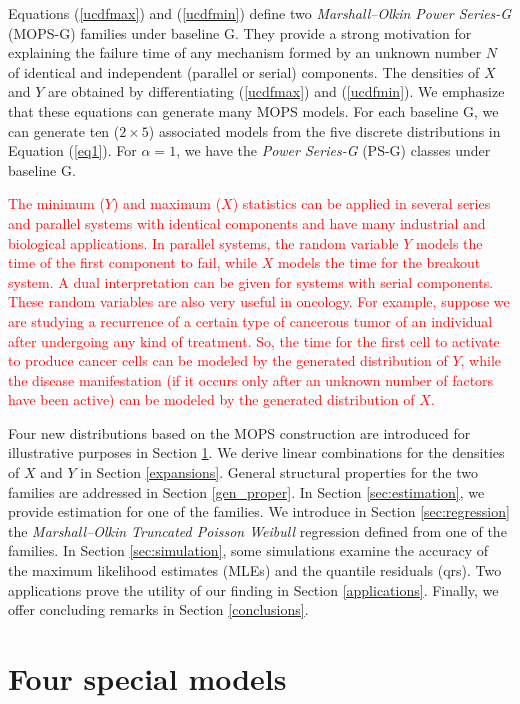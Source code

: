 \documentclass[12pt]{article}
\begin{document}
Equations (\ref{ucdfmax}) and (\ref{ucdfmin}) define two {\it Marshall--Olkin Power Series-G} (MOPS-G) families under baseline G. They provide a strong
motivation for explaining the failure time of any mechanism formed by an unknown number $N$ of identical and independent (parallel or serial) components.
The densities of $X$ and $Y$ are obtained by differentiating (\ref{ucdfmax}) and (\ref{ucdfmin}). We emphasize that these equations can generate many MOPS
models. For each baseline G, we can generate ten ($2 \times 5$) associated models from the five discrete distributions in Equation (\ref{eq1}).
For $\alpha=1$, we have the {\it Power Series-G} (PS-G) classes under baseline G.

\textcolor{red}{The minimum ($Y$) and maximum ($X$) statistics can be applied in several series and parallel systems with identical components
and have many industrial and biological applications. In parallel systems, the random variable $Y$ models the time of the first component to
fail, while $X$ models the time for the breakout system. A dual interpretation can be given for systems with serial components. These random variables
are also very useful in oncology. For example, suppose we are studying a recurrence of a certain type of cancerous tumor of an individual after undergoing
any kind of treatment. So, the time for the first cell to activate to produce cancer cells can be modeled by the generated distribution of $Y$, while
the disease manifestation (if it occurs only after an unknown number of factors have been active) can be modeled by the generated
distribution of $X$.}

Four new distributions based on the MOPS construction are introduced for
illustrative purposes in Section \ref{special}. We derive linear combinations for the densities of $X$ and $Y$ in Section \ref{expansions}.
General structural properties for the two families are addressed in Section \ref{gen_proper}. In Section \ref{sec:estimation}, we provide estimation for one
of the families. We introduce in Section \ref{sec:regression}
the {\it Marshall--Olkin Truncated Poisson Weibull} regression defined from one
of the families. In Section \ref{sec:simulation}, some simulations examine
the accuracy of the maximum likelihood estimates (MLEs) and the quantile residuals (qrs).
Two applications prove the utility of our finding in Section \ref{applications}.
Finally, we offer concluding remarks in Section \ref{conclusions}.


\section{Four special models}\label{special}
\end{document}
